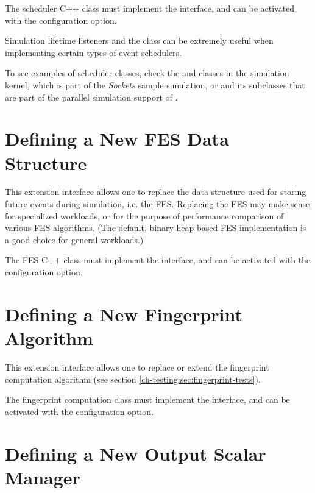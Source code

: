 The scheduler C++ class must implement the  interface,
and can be activated with the  configuration option.

Simulation lifetime listeners and the  class can be extremely
useful when implementing certain types of event schedulers.

To see examples of scheduler classes, check the
 and  classes in
the simulation kernel,  which is part of the
\textit{Sockets} sample simulation, or  and its
subclasses that are part of the parallel simulation support of {\opp}.


\section{Defining a New FES Data Structure}
\label{sec:plugin-exts:fes}

This extension interface allows one to replace the data structure used for
storing future events during simulation, i.e. the FES. Replacing the FES
may make sense for specialized workloads, or for the purpose of performance
comparison of various FES algorithms. (The default, binary heap based FES
implementation is a good choice for general workloads.)

The FES C++ class must implement the  interface,
and can be activated with the  configuration option.


\section{Defining a New Fingerprint Algorithm}
\label{sec:plugin-exts:fingerprint}

This extension interface allows one to replace or extend the fingerprint
computation algorithm (see section \ref{ch-testing:sec:fingerprint-tests}).


The fingerprint computation class must implement the  interface,
and can be activated with the  configuration option.


\section{Defining a New Output Scalar Manager}
\label{sec:plugin-exts:outputscalarmanager}

